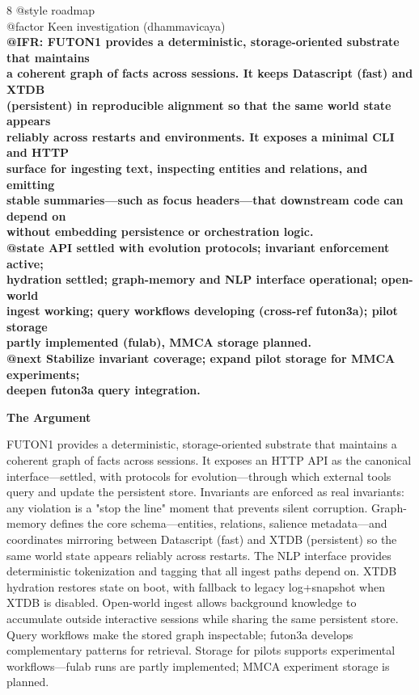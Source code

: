 \documentclass[landscape]{article}
\begin{document}
\begin{paracol}{8}
@style roadmap\\
@factor Keen investigation (dhammavicaya)\\
\textbf{@IFR: FUTON1 provides a deterministic, storage-oriented substrate that maintains}\\
\textbf{a coherent graph of facts across sessions. It keeps Datascript (fast) and XTDB}\\
\textbf{(persistent) in reproducible alignment so that the same world state appears}\\
\textbf{reliably across restarts and environments. It exposes a minimal CLI and HTTP}\\
\textbf{surface for ingesting text, inspecting entities and relations, and emitting}\\
\textbf{stable summaries—such as focus headers—that downstream code can depend on}\\
\textbf{without embedding persistence or orchestration logic.}\\
\textbf{@state API settled with evolution protocols; invariant enforcement active;}\\
\textbf{hydration settled; graph-memory and NLP interface operational; open-world}\\
\textbf{ingest working; query workflows developing (cross-ref futon3a); pilot storage}\\
\textbf{partly implemented (fulab), MMCA storage planned.}\\
\textbf{@next Stabilize invariant coverage; expand pilot storage for MMCA experiments;}\\
\textbf{deepen futon3a query integration.}\\
\par
\textbf{The Argument}\par
\par
FUTON1 provides a deterministic, storage-oriented substrate that maintains a coherent graph of facts across sessions. It exposes an HTTP API as the canonical interface—settled, with protocols for evolution—through which external tools query and update the persistent store. Invariants are enforced as real invariants: any violation is a "stop the line" moment that prevents silent corruption. Graph-memory defines the core schema—entities, relations, salience metadata—and coordinates mirroring between Datascript (fast) and XTDB (persistent) so the same world state appears reliably across restarts. The NLP interface provides deterministic tokenization and tagging that all ingest paths depend on. XTDB hydration restores state on boot, with fallback to legacy log+snapshot when XTDB is disabled. Open-world ingest allows background knowledge to accumulate outside interactive sessions while sharing the same persistent store. Query workflows make the stored graph inspectable; futon3a develops complementary patterns for retrieval. Storage for pilots supports experimental workflows—fulab runs are partly implemented; MMCA experiment storage is planned.\\

\end{paracol}
\end{document}
